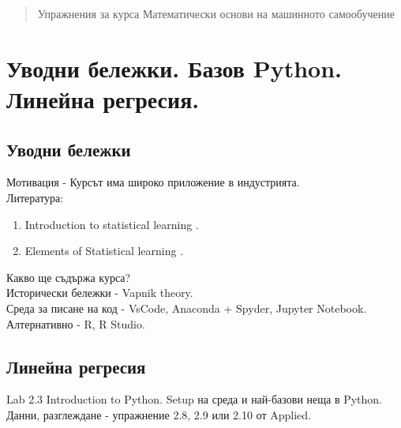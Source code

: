 \documentclass{article}
\begin{document}
	\newpage
	\date{}
	\maketitle

	\begin{abstract}
		Упражнения за курса Математически основи на машинното самообучение
	\end{abstract}
	
	\tableofcontents
		


	\section{Уводни бележки. Базов Python. Линейна регресия.}
	\subsection{Уводни бележки}
	Мотивация - Курсът има широко приложение в индустрията.\\	
	Литература:
	\begin{enumerate}
	\item  Introduction to statistical learning \cite{james2023introduction}.
	\item  Elements of Statistical learning  \cite{hastie01statisticallearning}.
	\end{enumerate}
	
	\noindent
	Какво ще съдържа курса? \\
	
	\noindent
	Исторически бележки - Vapnik theory. \\

	\noindent	
	Среда за писане на код - VsCode, Anaconda + Spyder, Jupyter Notebook. \\
 	Алтернативно - R, R Studio.
	\subsection{Линейна регресия}
	Lab 2.3 Introduction to Python. Setup на среда и най-базови неща в Python.\\
	Данни, разглеждане - упражнение 2.8, 2.9 или 2.10 от Applied. \\
	
\end{document}
